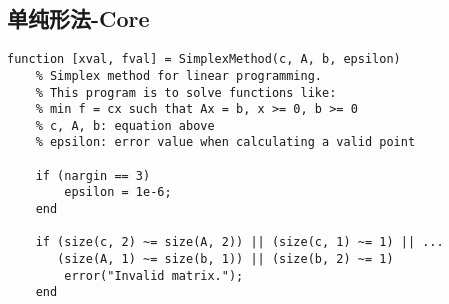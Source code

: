 \documentclass[bwprint, withouttitlepage]{mathexpthesis}
\begin{document}
\subsection{单纯形法-Core}
\begin{verbatim}
function [xval, fval] = SimplexMethod(c, A, b, epsilon)
    % Simplex method for linear programming.
    % This program is to solve functions like:
    % min f = cx such that Ax = b, x >= 0, b >= 0
    % c, A, b: equation above
    % epsilon: error value when calculating a valid point
    
    if (nargin == 3)
        epsilon = 1e-6;
    end

    if (size(c, 2) ~= size(A, 2)) || (size(c, 1) ~= 1) || ...
       (size(A, 1) ~= size(b, 1)) || (size(b, 2) ~= 1)
        error("Invalid matrix.");
    end


\end{verbatim}
\end{document}
